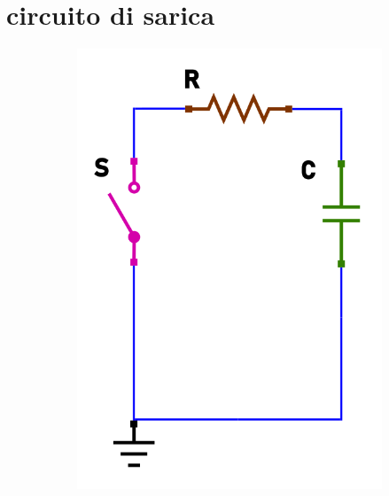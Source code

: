 \documentclass[12pt]{article}
\begin{document}
\newpage
\section*{circuito di sarica}

\begin{figure}[h!]
  \centering
  \begin{subfigure}[b]{0.3\linewidth}
    \includegraphics[width=\linewidth]{data/scarica-open.png}
  \end{subfigure}
  \begin{subfigure}[b]{0.3\linewidth}

\end{subfigure}
\end{figure}
\end{document}
